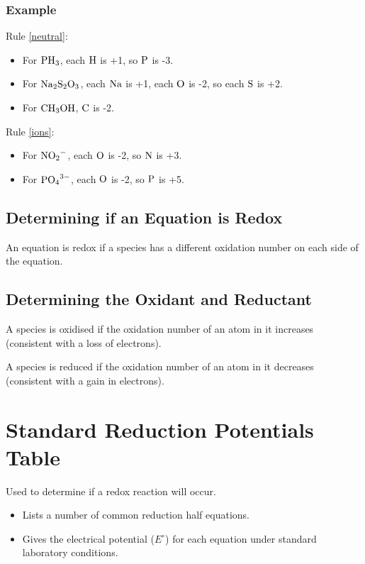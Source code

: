 \documentclass[a4paper,11pt]{article}
\begin{document}
\subsubsection{Example}

Rule \ref{neutral}:

\begin{itemize}
\item For $\ce{PH3}$, each $\ce{H}$ is +1, so $\ce{P}$ is -3.
\item For $\ce{Na2S2O3}$, each $\ce{Na}$ is +1, each $\ce{O}$ is -2, so each
	$\ce{S}$ is +2.
\item For $\ce{CH3OH}$, $\ce{C}$ is -2.
\end{itemize}

Rule \ref{ions}:

\begin{itemize}
\item For $\ce{NO2^{-}}$, each $\ce{O}$ is -2, so $\ce{N}$ is +3.
\item For $\ce{PO4^{3-}}$, each $\ce{O}$ is -2, so $\ce{P}$ is +5.
\end{itemize}

\subsection{Determining if an Equation is Redox}

An equation is redox if a species has a different oxidation number on each side
of the equation.

\subsection{Determining the Oxidant and Reductant}

A species is oxidised if the oxidation number of an atom in it increases
(consistent with a loss of electrons).

A species is reduced if the oxidation number of an atom in it decreases
(consistent with a gain in electrons).



\section{Standard Reduction Potentials Table}

Used to determine if a redox reaction will occur.

\begin{itemize}
\item Lists a number of common reduction half equations.
\item Gives the electrical potential ($E^\circ$) for each equation under
	standard laboratory conditions.
\end{itemize}
\end{document}
